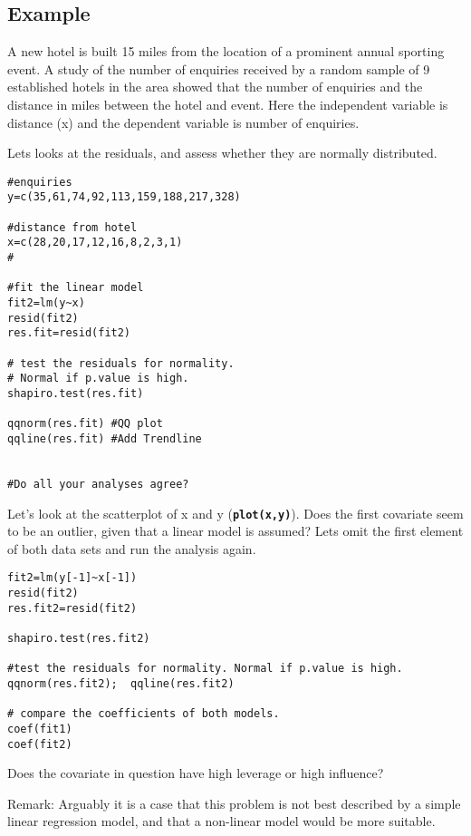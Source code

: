 \documentclass[a4paper,12pt]{article}
\begin{document}
\subsection{Example}
A new hotel is built 15 miles from the location of a prominent annual sporting event. A study of the number of enquiries received by a random sample of 9 established hotels in the area showed that the number of enquiries and the distance in miles between the hotel and event. Here the independent variable is distance (x) and the dependent variable is number of enquiries.

Lets looks at the residuals, and assess whether they are normally distributed.

\begin{framed}
\begin{verbatim}
#enquiries
y=c(35,61,74,92,113,159,188,217,328)
 	
#distance from hotel
x=c(28,20,17,12,16,8,2,3,1)	
#

#fit the linear model	
fit2=lm(y~x)					
resid(fit2)
res.fit=resid(fit2)

# test the residuals for normality.
# Normal if p.value is high.
shapiro.test(res.fit)	
	
qqnorm(res.fit)	#QQ plot
qqline(res.fit)	#Add Trendline


#Do all your analyses agree?

\end{verbatim}
\end{framed}
Let’s look at the scatterplot of x and y (\textbf{\texttt{plot(x,y)}}).  Does the first covariate seem to be an outlier, given that a linear model is assumed?
Lets omit the first element of both data sets and run the analysis again.

\begin{framed}
\begin{verbatim}
fit2=lm(y[-1]~x[-1])
resid(fit2)
res.fit2=resid(fit2)

shapiro.test(res.fit2)			

#test the residuals for normality. Normal if p.value is high.
qqnorm(res.fit2);  qqline(res.fit2)			

# compare the coefficients of both models.
coef(fit1)
coef(fit2)

\end{verbatim}
\end{framed}
Does the covariate in question have high leverage or high influence?


Remark: Arguably it is a case that this problem is not best described by a simple linear regression model, and that a non-linear model would be more suitable.
\end{document}
